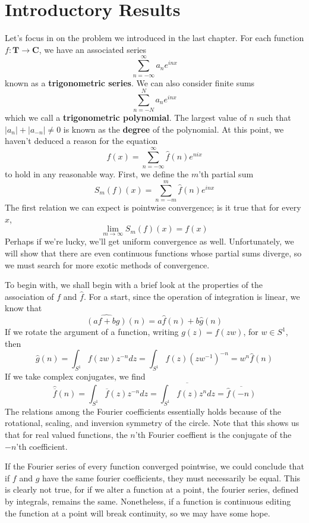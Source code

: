 \chapter{Introductory Results}

Let's focus in on the problem we introduced in the last chapter. For each function $f: \mathbf{T} \to \mathbf{C}$, we have an associated series
%
\[ \sum_{n = -\infty}^\infty a_n e^{inx} \]
%
known as a {\bf trigonometric series}. We can also consider finite sums
%
\[ \sum_{n = -N}^N a_n e^{inx} \]
%
which we call a {\bf trigonometric polynomial}. The largest value of $n$ such that $|a_n| + |a_{-n}| \neq 0$ is known as the {\bf degree} of the polynomial. At this point, we haven't deduced a reason for the equation
%
\[ f(x) = \sum_{n = -\infty}^\infty \hat{f}(n) e^{nix} \]
%
to hold in any reasonable way. First, we define the $m$'th partial sum
%
\[ S_m(f)(x) = \sum_{n = -m}^m \hat{f}(n) e^{inx} \]
%
The first relation we can expect is pointwise convergence; is it true that for every $x$,
%
\[ \lim_{m \to \infty} S_m(f)(x) = f(x) \]
%
Perhaps if we're lucky, we'll get uniform convergence as well. Unfortunately, we will show that there are even continuous functions whose partial sums diverge, so we must search for more exotic methods of convergence.

To begin with, we shall begin with a brief look at the properties of the association of $f$ and $\hat{f}$. For a start, since the operation of integration is linear, we know that
%
\[ \widehat{(af + bg)}(n) = a \hat{f}(n) + b \hat{g}(n) \]
%
If we rotate the argument of a function, writing $g(z) = f(zw)$, for $w \in S^1$, then
%
\[ \hat{g}(n) = \int_{S^1} f(zw) z^{-n} dz = \int_{S^1} f(z) (zw^{-1})^{-n} = w^n \hat{f}(n) \]
%
If we take complex conjugates, we find
%
\[ \hat{\overline{f}}(n) = \int_{S^1} \overline{f}(z) z^{-n} dz = \overline{\int_{S^1} f(z) z^n dz} = \overline{\hat{f}(-n)} \]
%
The relations among the Fourier coefficients essentially holds because of the rotational, scaling, and inversion symmetry of the circle. Note that this shows us that for real valued functions, the $n$'th Fourier coeffient is the conjugate of the $-n$'th coefficient.

If the Fourier series of every function converged pointwise, we could conclude that if $f$ and $g$ have the same fourier coefficients, they must necessarily be equal. This is clearly not true, for if we alter a function at a point, the fourier series, defined by integrals, remains the same. Nonetheless, if a function is continuous editing the function at a point will break continuity, so we may have some hope.


